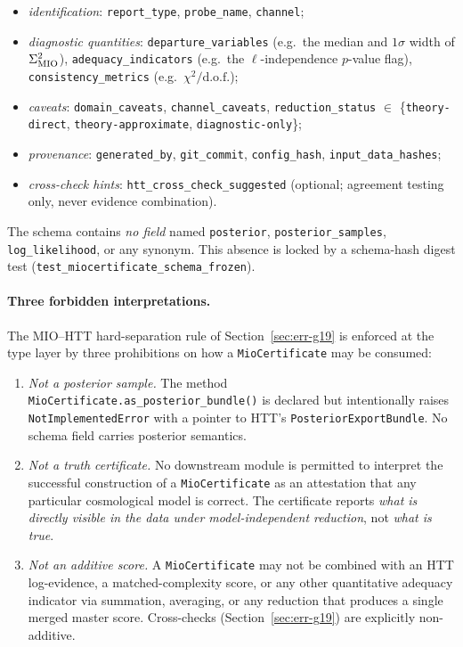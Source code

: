 \begin{itemize}
\item \emph{identification}: \texttt{report\_type},
  \texttt{probe\_name}, \texttt{channel};
\item \emph{diagnostic quantities}:
  \texttt{departure\_variables} (e.g.\ the median and
  $1\sigma$ width of $\Sigma^2_{\rm MIO}$),
  \texttt{adequacy\_indicators} (e.g.\ the
  $\ell$-independence $p$-value flag),
  \texttt{consistency\_metrics}
  (e.g.\ $\chi^2/\text{d.o.f.}$);
\item \emph{caveats}: \texttt{domain\_caveats},
  \texttt{channel\_caveats},
  \texttt{reduction\_status} $\in$ \{\texttt{theory-direct},
  \texttt{theory-approximate}, \texttt{diagnostic-only}\};
\item \emph{provenance}: \texttt{generated\_by},
  \texttt{git\_commit}, \texttt{config\_hash},
  \texttt{input\_data\_hashes};
\item \emph{cross-check hints}:
  \texttt{htt\_cross\_check\_suggested} (optional; agreement
  testing only, never evidence combination).
\end{itemize}

The schema contains \emph{no field} named
\texttt{posterior}, \texttt{posterior\_samples},
\texttt{log\_likelihood}, or any synonym.  This absence is
locked by a schema-hash digest test
(\texttt{test\_miocertificate\_schema\_frozen}).


\paragraph{Three forbidden interpretations.}

The MIO--HTT hard-separation rule of
Section~\ref{sec:err-g19} is enforced at the type layer by
three prohibitions on how a \texttt{MioCertificate} may be
consumed:

\begin{enumerate}
\item \emph{Not a posterior sample.} The method
  \texttt{MioCertificate.as\_posterior\_bundle()} is declared
  but intentionally raises \texttt{NotImplementedError} with
  a pointer to HTT's \texttt{PosteriorExportBundle}.  No
  schema field carries posterior semantics.
\item \emph{Not a truth certificate.} No downstream module is
  permitted to interpret the successful construction of a
  \texttt{MioCertificate} as an attestation that any
  particular cosmological model is correct.  The certificate
  reports \emph{what is directly visible in the data under
  model-independent reduction}, not \emph{what is true}.
\item \emph{Not an additive score.} A
  \texttt{MioCertificate} may not be combined with an HTT
  log-evidence, a matched-complexity score, or any other
  quantitative adequacy indicator via summation, averaging,
  or any reduction that produces a single merged master
  score.  Cross-checks (Section~\ref{sec:err-g19}) are
  explicitly non-additive.
\end{enumerate}


